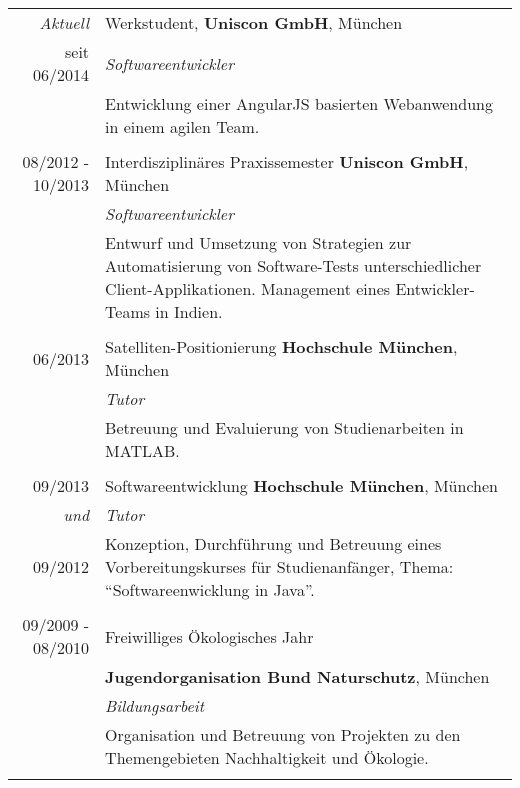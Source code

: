 \documentclass[a4paper,10pt]{article} %
\begin{document}
\begin{tabular}{r|p{11cm}}
 
\emph{Aktuell}             & Werkstudent, \textbf{Uniscon GmbH}, München\\
seit \textsc{06/2014}      & \emph{Softwareentwickler}\\
                           & \small{Entwicklung einer AngularJS basierten Webanwendung in einem agilen Team.} \\
\multicolumn{2}{c}{} \\
\textsc{08/2012 - 10/2013} & Interdisziplinäres Praxissemester \textbf{Uniscon GmbH}, München\\
                           & \emph{Softwareentwickler}\\
 & \small{Entwurf und Umsetzung von Strategien zur Automatisierung von Software-Tests unterschiedlicher Client-Applikationen. Management eines Entwickler-Teams in Indien.} \\
\multicolumn{2}{c}{} \\
 
 
\textsc{06/2013}           & Satelliten-Positionierung \textbf{Hochschule München}, München\\
                           & \emph{Tutor}\\
                           & \small{Betreuung und Evaluierung von Studienarbeiten in MATLAB.}\\
\multicolumn{2}{c}{} \\
 
 
\textsc{09/2013}           & Softwareentwicklung \textbf{Hochschule München}, München\\
\emph{und}                 & \emph{Tutor}\\
\textsc{09/2012}           & \small{Konzeption, Durchführung und Betreuung eines Vorbereitungskurses für Studienanfänger, Thema: ``Softwareenwicklung in Java''.}\\
\multicolumn{2}{c}{} \\
 
 
\textsc{09/2009 - 08/2010} & Freiwilliges Ökologisches Jahr \\
                           & \textbf{Jugendorganisation Bund Naturschutz}, München\\
                           & \emph{Bildungsarbeit}\\
                           & \small{Organisation und Betreuung von Projekten zu den Themengebieten Nachhaltigkeit und Ökologie.}\\
\multicolumn{2}{c}{} \\
 
\end{tabular}
 
\end{document}
